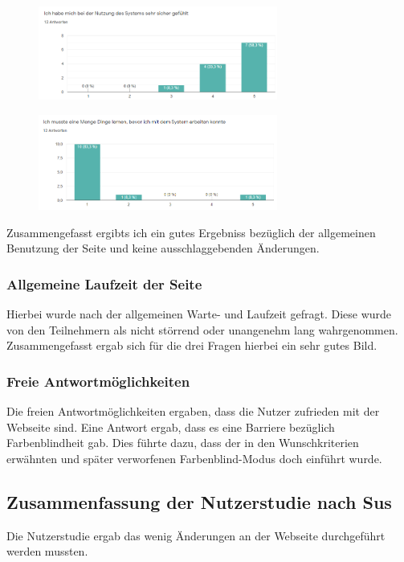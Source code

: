 \noChanges
\begin{figure}[H]
    \centering
    \includegraphics[width=0.7\textwidth]{media/survey/safeUsage.png}
\end{figure}

\noChanges
\begin{figure}[H]
    \centering
    \includegraphics[width=0.7\textwidth]{media/survey/needToLearnUsage.png}
\end{figure}

\noChanges

Zusammengefasst ergibts ich ein gutes Ergebniss bezüglich der allgemeinen Benutzung der Seite und keine ausschlaggebenden Änderungen.
\subsubsection{Allgemeine Laufzeit der Seite}
Hierbei wurde nach der allgemeinen Warte- und Laufzeit gefragt. Diese wurde von den Teilnehmern als nicht störrend oder unangenehm lang wahrgenommen.
Zusammengefasst ergab sich für die drei Fragen hierbei ein sehr gutes Bild. 

\subsubsection{Freie Antwortmöglichkeiten}
Die freien Antwortmöglichkeiten ergaben, dass die Nutzer zufrieden mit der Webseite sind. 
Eine Antwort ergab, dass es eine Barriere bezüglich Farbenblindheit gab.
Dies führte dazu, dass der in den Wunschkriterien erwähnten und später verworfenen Farbenblind-Modus doch einführt wurde. 

\subsection{Zusammenfassung der Nutzerstudie nach Sus}

Die Nutzerstudie ergab das wenig Änderungen an der Webseite durchgeführt werden mussten.